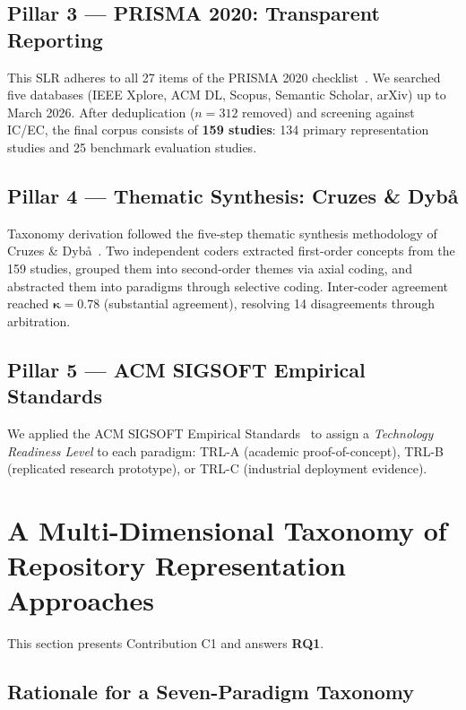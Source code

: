\documentclass[acmsmall,screen,review]{acmart}
\begin{document}
\subsection{Pillar 3 — PRISMA 2020: Transparent Reporting}

This SLR adheres to all 27 items of the PRISMA 2020
checklist~\cite{Page2021PRISMA}. We searched five databases (IEEE
Xplore, ACM DL, Scopus, Semantic Scholar, arXiv) up to March 2026.
After deduplication ($n = 312$ removed) and screening against IC/EC,
the final corpus consists of \textbf{159 studies}: 134 primary
representation studies and 25 benchmark evaluation studies.

\subsection{Pillar 4 — Thematic Synthesis: Cruzes \& Dyb\aa}

Taxonomy derivation followed the five-step thematic synthesis
methodology of Cruzes \& Dyb\aa{}~\cite{Cruzes2011}. Two independent
coders extracted first-order concepts from the 159 studies, grouped
them into second-order themes via axial coding, and abstracted them into
paradigms through selective coding. Inter-coder agreement reached
$\bm{\kappa = 0.78}$ (substantial agreement), resolving 14 disagreements
through arbitration.

\subsection{Pillar 5 — ACM SIGSOFT Empirical Standards}

We applied the ACM SIGSOFT Empirical
Standards~\cite{ACMEmpiricalStandards} to assign a \emph{Technology
Readiness Level} to each paradigm: TRL-A (academic proof-of-concept),
TRL-B (replicated research prototype), or TRL-C (industrial deployment
evidence).

\section{A Multi-Dimensional Taxonomy of Repository Representation
  Approaches}
\label{sec:taxonomy}

This section presents Contribution C1 and answers \textbf{RQ1}.

\subsection{Rationale for a Seven-Paradigm Taxonomy}
\label{subsec:rationale}
\end{document}
